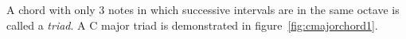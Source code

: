 A chord with only 3 notes in which successive intervals are in the same octave is called a \textit{triad}. A C major triad is demonstrated in figure~\ref{fig:cmajorchord1}.



